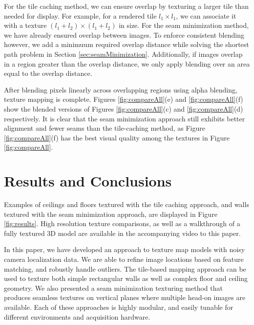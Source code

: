 \documentclass[10pt,twocolumn,letterpaper]{article}
\begin{document}
For the tile caching method, we can ensure overlap by texturing a
larger tile than needed for display. For example, for a rendered tile
$l_1 \times l_1$, we can associate it with a texture $(l_1 + l_2)
\times (l_1 + l_2)$ in size. For the seam minimization method, we have
already ensured overlap between images. To enforce consistent blending
however, we add a minimuum required overlap distance while solving the
shortest path problem in Section
\ref{sec:seamMinimization}. Additionally, if images overlap in a
region greater than the overlap distance, we only apply blending over
an area equal to the overlap distance.

After blending pixels linearly across overlapping regions using alpha
blending, texture mapping is complete. Figures \ref{fig:compareAll}(e)
and \ref{fig:compareAll}(f) show the blended versions of Figures
\ref{fig:compareAll}(c) and \ref{fig:compareAll}(d) respectively. It
is clear that the seam minimization approach still exhibits better
alignment and fewer seams than the tile-caching method, as Figure
\ref{fig:compareAll}(f) has the best visual quality among the textures
in Figure \ref{fig:compareAll}.



\section{Results and Conclusions}
\label{sec:resultsAndConclusions}
Examples of ceilings and floors textured with the tile caching
approach, and walls textured with the seam minimization approach, are
displayed in Figure \ref{fig:results}. High resolution texture
comparisons, as well as a walkthrough of a fully textured 3D model are
available in the accompanying video to this paper.

In this paper, we have developed an approach to texture map models
with noisy camera localization data. We are able to refine image
locations based on feature matching, and robustly handle outliers. The
tile-based mapping approach can be used to texture both simple
rectangular walls as well as complex floor and ceiling geometry. We
also presented a seam minimization texturing method that produces
seamless textures on vertical planes where multiple head-on images are
available. Each of these approaches is highly modular, and easily
tunable for different environments and acquisition hardware.
\end{document}
